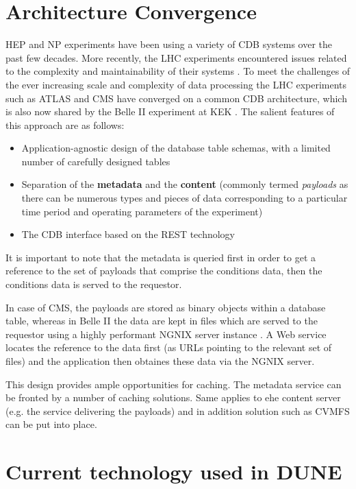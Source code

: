 \documentclass[pdftex,12pt,letter]{article}
\begin{document}
\section{Architecture Convergence}

HEP and NP experiments have been using a variety of CDB systems over the past few decades.
More recently, the LHC experiments encountered issues related to the complexity and
maintainability of their systems \cite{func_test}. To meet the challenges of the ever increasing scale
and complexity of data processing the LHC experiments such as ATLAS and CMS have converged on
a common CDB architecture, which is also now shared by the Belle II experiment at KEK \cite{b2cdb}.
The salient features of this approach are as follows:
\begin{itemize}

\item Application-agnostic design of the database table schemas, with a limited number of
carefully designed tables

\item Separation of the \textbf{metadata} and the \textbf{content}
(commonly termed \textit{payloads} as there can be numerous types and pieces of data corresponding
to a particular time period and operating parameters of the experiment)

\item The CDB interface based on the REST technology
\end{itemize}


\noindent  It is important to note that  the metadata is queried first in order to get a reference to the
set of payloads that comprise the conditions data, then the conditions data is served to the requestor.

In case of CMS, the payloads are stored as binary objects within a database table, whereas in Belle II
the data are kept in files which are served to the requestor using a highly performant NGNIX server instance
\cite{nginx}. A Web service locates the reference to the data first (as URLs pointing to the relevant set of files)
and the application then obtaines these data via the NGNIX server.

This design provides ample opportunities for caching. The metadata service can be fronted by a number
of caching solutions. Same applies to ehe content server (e.g. the service delivering the payloads) and in
addition solution such as CVMFS can be put into place.

\section{Current technology used in DUNE}
\end{document}
